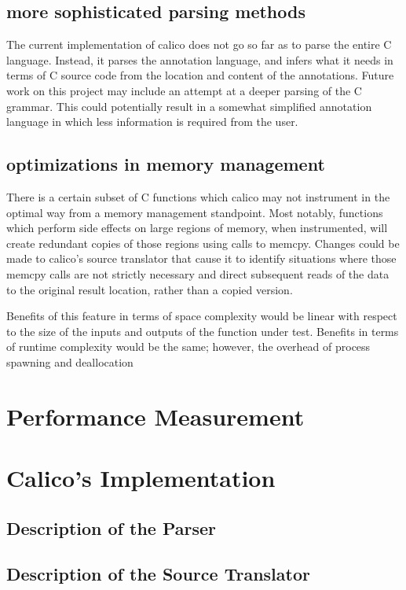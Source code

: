 \documentclass[notitlepage]{article}
\begin{document}
\subsection{more sophisticated parsing methods}

The current implementation of calico does not go so far as to parse the entire C language. Instead, it parses the annotation language, and infers what it needs in terms of C source code from the location and content of the annotations. Future work on this project may include an attempt at a deeper parsing of the C grammar. This could potentially result in a somewhat simplified annotation language in which less information is required from the user.

\subsection{optimizations in memory management}

There is a certain subset of C functions which calico may not instrument in the optimal way from a memory management standpoint. Most notably, functions which perform side effects on large regions of memory, when instrumented, will create redundant copies of those regions using calls to memcpy. Changes could be made to calico's source translator that cause it to identify situations where those memcpy calls are not strictly necessary and direct subsequent reads of the data to the original result location, rather than a copied version.

Benefits of this feature in terms of space complexity would be linear with respect to the size of the inputs and outputs of the function under test. Benefits in terms of runtime complexity would be the same; however, the overhead of process spawning and deallocation

\section{Performance Measurement}

\section{Calico's Implementation}

\subsection{Description of the Parser}

\subsection{Description of the Source Translator}
\end{document}
